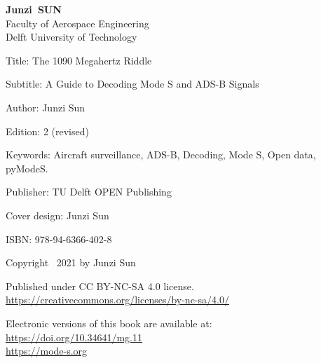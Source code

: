 \begin{titlepage}

\thispagestyle{empty}




{
    \centering
    \vspace*{2\bigskipamount}
        
    {\makeatletter
    \titlestyle\bfseries\Huge\@title
    \makeatother}

    {\makeatletter
    \ifx\@subtitle\undefined\else
        \bigskip
        \titlefont\titleshape\LARGE\@subtitle
    \fi
    \makeatother}


    \vspace*{30\bigskipamount}


    \makeatletter
    {
        \Large{\titlefont\bfseries{Junzi}\ {SUN}} \\
        \vspace*{1\bigskipamount}
        \normalsize{Faculty of Aerospace Engineering} \\
        \normalsize{Delft University of Technology} \\
    }
    \makeatother

}



\clearpage


\thispagestyle{empty}

\vspace*{16\bigskipamount}


Title: The 1090 Megahertz Riddle

\smallskip

Subtitle: A Guide to Decoding Mode S and ADS-B Signals

\smallskip

Author: Junzi Sun

\smallskip

Edition: 2 (revised)

\smallskip

Keywords: Aircraft surveillance, ADS-B, Decoding, Mode S, Open data, pyModeS.

\smallskip

Publisher: TU Delft OPEN Publishing

\smallskip

Cover design: Junzi Sun

\smallskip
ISBN: 978-94-6366-402-8

\vspace{4\bigskipamount}


Copyright \textcopyright\ 2021 by Junzi Sun

\medskip

Published under CC BY-NC-SA 4.0 license.\\
\url{https://creativecommons.org/licenses/by-nc-sa/4.0/}


\medskip
\medskip
Electronic versions of this book are available at: \\
\url{https://doi.org/10.34641/mg.11}\\
\url{https://mode-s.org}

\end{titlepage}